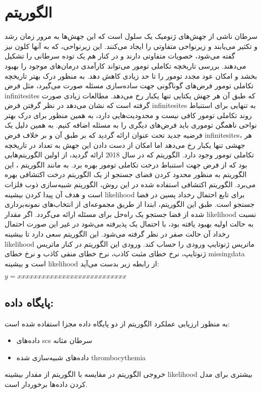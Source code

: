 \section{الگوریتم  \cite{ross2016onconem}}
سرطان ناشی از جهش‌های ژنومیک یک سلول است که این جهش‌ها به مرور زمان رشد و تکثیر می‌یابند و زیرنواحی متفاوتی را ایجاد می‌کنند. این زیرنواحی، که به آنها کلون نیز گفته می‌شود، خصویات متفاوتی دارند و در کنار هم یک توده سرطانی را تشکیل می‌دهند. بررسی تاریخچه تکاملی تومور می‌تواند کارآمدی درمان‌های موجود را بهبود بخشد و امکان عود مجدد تومور را تا حد زیادی کاهش دهد. به منظور درک بهتر تاریخچه تکاملی تومور فرض‌های گوناگونی جهت ساده‌سازی مسئله صورت می‌گیرد، مثل فرض \gls{infinitesites} که طبق آن هر جهش یکتایی تنها یکبار رخ می‌دهد. مطالعات زیادی صورت گرفته است که نشان می‌دهد در نظر گرفتن فرض \gls{infinitesites} به تنهایی برای استنباط روند تکاملی تومور کافی نیست و محدودیت‌هایی دارد، به همین منظور برای درک بهتر نواحی ناهمگن توموری باید فرض‌های دیگری را به مسئله اضافه کنیم. به همین دلیل یک فرضیه جدید تحت عنوان  ارائه گردید که بر طبق آن و بر خلاف فرض \gls{infinitesites}، هر جهشی تنها یکبار رخ می‌دهد اما امکان از دست دادن این جهش به تعداد  در تاریخچه تکاملی تومور وجود دارد. الگوریتم  که در سال 2018 ارائه گردید، از اولین الگوریتم‌هایی بود که از فرض  جهت استنباط درخت تکاملی تومور بهره برد. به مانند الگوریتم ، این الگوریتم به منظور محدود کردن فضای جستجو از یک الگوریتم درخت اکتشافی بهره می‌برد. الگوریتم اکتشافی استفاده شده در این روش، الگوریتم شبیه‌سازی ذوب فلزات است و هدف آن پیدا کردن بیشینه \gls{likelihood} برای تابع احتمال رخداد پسین در فضا جستجو است. طبق این الگوریتم، ابتدا از طریق مجموعه‌ای از انتخاب‌های نمونه‌برداری شده از فضا جستجو یک راه‌حل برای مسئله ارائه می‌گردد. اگر مقدار \gls{likelihood} نسبت به حالت اولیه بهبود یافته بود، با احتمال یک پذیرفته می‌شود در غیر این صورت احتمال رخداد آن حالت صفر در نظر گرفته می‌شود. این الگوریتم سعی دارد تا بیشینه \gls{likelihood} ماتریس ژنوتایپ ورودی را حساب کند. ورودی این الگوریتم در کنار ماتریس ژنوتایپ، نرخ خطای مثبت کاذب، نرخ  خطای منفی کاذب و نرخ خطای \gls{missingdata} است و بیشینه \gls{likelihood} از رابطه زیر بدست می‌آید: 

\begin{math}
	y=xxxxxxxxxxxxxxxxxxxxxxxxxxx
\end{math}

\subsection{پایگاه داده: }

به منظور ارزیابی عملکرد الگوریتم  از دو پایگاه داده مجزا استفاده شده است: 
\begin{itemize}
	\item داده‌های \gls{scs} سرطان مثانه
    \item داده‌های شبیه‌سازی شده \gls{thrombocythemia} 
\end{itemize}
خروجی الگوریتم در مقایسه با الگوریتم  از مقدار بیشینه \gls{likelihood} بیشتری برای مدل کردن داده‌ها برخوردار است. 


